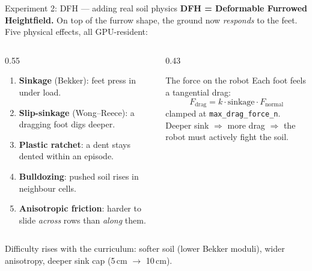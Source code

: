 \documentclass[aspectratio=169,10pt]{beamer}
\begin{document}
\begin{frame}{Experiment 2: DFH --- adding real soil physics}
  \textbf{DFH = Deformable Furrowed Heightfield.} On top of the furrow shape, the
  ground now \emph{responds} to the feet. Five physical effects, all GPU-resident:

  \vspace{0.5em}
  \begin{columns}[T]
    \begin{column}{0.55\textwidth}
      \begin{enumerate}
        \item \textbf{Sinkage} (Bekker): feet press in under load.
        \item \textbf{Slip-sinkage} (Wong--Reece): a dragging foot digs deeper.
        \item \textbf{Plastic ratchet}: a dent stays dented within an episode.
        \item \textbf{Bulldozing}: pushed soil rises in neighbour cells.
        \item \textbf{Anisotropic friction}: harder to slide \emph{across} rows
              than \emph{along} them.
      \end{enumerate}
    \end{column}
    \begin{column}{0.43\textwidth}
      \begin{block}{The force on the robot}
        Each foot feels a tangential drag:
        \[
          F_{\text{drag}} = k \cdot \text{sinkage} \cdot F_{\text{normal}}
        \]
        clamped at \texttt{max\_drag\_force\_n}.
        \\[0.4em]
        \footnotesize Deeper sink $\Rightarrow$ more drag $\Rightarrow$ the robot
        must actively fight the soil.
      \end{block}
    \end{column}
  \end{columns}

  \vspace{0.4em}
  \footnotesize Difficulty rises with the curriculum: softer soil (lower Bekker
  moduli), wider anisotropy, deeper sink cap (5\,cm $\rightarrow$ 10\,cm).
\end{frame}
\end{document}
